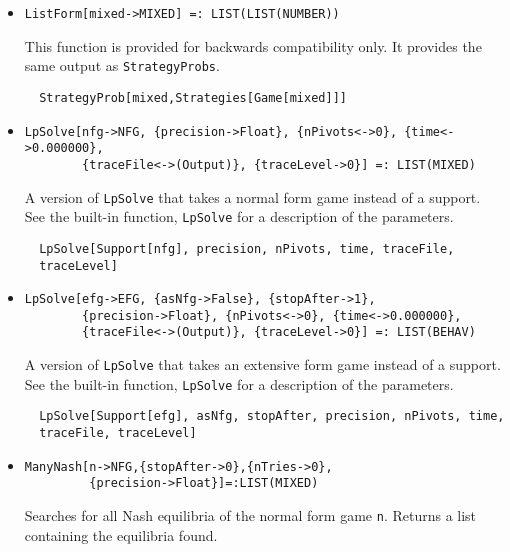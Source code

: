 \begin{itemize}
\item{}
\protect \large \begin{verbatim}
ListForm[mixed->MIXED] =: LIST(LIST(NUMBER)) 
\end{verbatim}\normalsize

\bd 
This function is provided for backwards compatibility only.  It
provides the same output as \verb+StrategyProbs+.
\begin{verbatim}
  StrategyProb[mixed,Strategies[Game[mixed]]]
\end{verbatim} 
\ed

\item{}
\protect \large \begin{verbatim}
LpSolve[nfg->NFG, {precision->Float}, {nPivots<->0}, {time<->0.000000}, 
        {traceFile<->(Output)}, {traceLevel->0}] =: LIST(MIXED) 
\end{verbatim}\normalsize

\bd 
A version of \verb+LpSolve+ that takes a normal form
game instead of a support.  See the built-in function,
\verb+LpSolve+ for a description of the parameters.
\begin{verbatim}
  LpSolve[Support[nfg], precision, nPivots, time, traceFile, 
  traceLevel]
\end{verbatim} 
\ed

\item{}
\protect \large \begin{verbatim}
LpSolve[efg->EFG, {asNfg->False}, {stopAfter->1},
        {precision->Float}, {nPivots<->0}, {time<->0.000000}, 
        {traceFile<->(Output)}, {traceLevel->0}] =: LIST(BEHAV) 
\end{verbatim}\normalsize

\bd 
A version of \verb+LpSolve+ that takes an extensive form
game instead of a support.  See the built-in function,
\verb+LpSolve+ for a description of the parameters.
\begin{verbatim}
  LpSolve[Support[efg], asNfg, stopAfter, precision, nPivots, time, 
  traceFile, traceLevel]
\end{verbatim} 
\ed


\item{}
\protect \large \begin{verbatim}
ManyNash[n->NFG,{stopAfter->0},{nTries->0},
         {precision->Float}]=:LIST(MIXED)
\end{verbatim}\normalsize

\bd 
Searches for all Nash equilibria of the normal form game
\verb+n+.  Returns a list containing the equilibria found.


\end{itemize}
